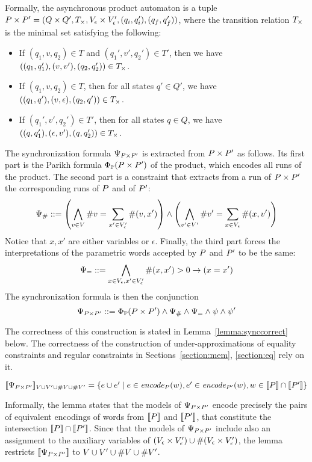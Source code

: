 \documentclass[sigplan,review,anonymous]{acmart}\settopmatter{printfolios=true,printccs=false,printacmref=false}
\begin{document}
Formally, the asynchronous product automaton is a tuple $P \times P' = (Q\times Q', T_\times, V_\epsilon \times V'_\epsilon, (q_i,q_i'),(q_f,q_f'))$, where the transition relation $T_\times$ is the minimal set satisfying the following:
%
\begin{itemize}
\item If $(q_1,v,q_2) \in T$ and $(q_1',v',q_2') \in T'$, then we have $((q_1,q_1'),(v,v'),(q_2,q_2'))\in T_\times$.
\item If $(q_1,v,q_2) \in T$, then for all states $q'\in Q'$, we have $((q_1,q'),(v,\epsilon),(q_2,q'))\in T_\times$.
\item If $(q_1',v',q_2') \in T'$, then for all states $q\in Q$, we have $((q,q_1'),(\epsilon,v'),(q,q_2'))\in T_\times$.
\end{itemize}	
%
The synchronization formula $\Psi_{P \times P'}$ is extracted from $P \times P'$ as follows.
Its first part is the Parikh formula $\Phi_{\mathbb{P}}(P \times P')$ of the product, which encodes all runs of the product.
%
The second part is a constraint that extracts from a run of $P \times P'$ the corresponding runs of $P$ and of $P'$:
$$ \Psi_{\#} ::= 
\left(\bigwedge_{v\in V}\#v = \sum_{x' \in V'_\epsilon} \#{(v,x')}\right)
\land
\left(\bigwedge_{v'\in V'} \#v' = \sum_{x \in V_\epsilon} \#{(x,v')}\right)
$$
Notice that $x,x'$ are either variables or $\epsilon$.
Finally, the third part forces the interpretations of the parametric words accepted by $P$ and $P'$ to be the same:
$$ \Psi_= ::=
\bigwedge_{x\in V_\epsilon,x'\in V'_\epsilon} \#(x,x')>0 \rightarrow (x=x')
$$
The synchronization formula is then the conjunction 
$$
\Psi_{P \times P'} ::= \Phi_{\mathbb{P}}(P \times P') \land \Psi_{\#} \land \Psi_= \land \psi \land \psi'
$$

The correctness of this construction is stated in Lemma~\ref{lemma:synccorrect} below. 
The correctness of the construction of under-approximations of equality constraints and regular constraints in Sections~\ref{section:mem}, \ref{section:eq} rely on it. 
%

\begin{lemma}\label{lemma:synccorrect}
$
[\![\Psi_{P \times P'}]\!]_{V\cup V' \cup \#{V}\cup\#{V'}} =
\{e\cup e'\mid e \in \mathit{encode}_{P} (w), e'\in\mathit{encode}_{P'} (w), w\in[\![P]\!] \cap [\![P']\!]\} 
$
\end{lemma}

Informally, the lemma states that the models of $\Psi_{P \times P'}$ encode precisely the pairs of equivalent encodings of words from $[\![P]\!]$ and $[\![P']\!]$, that constitute the intersection $[\![P]\!] \cap [\![P']\!]$. 
Since that the models of $\Psi_{P \times P'}$ include also an assignment to the auxiliary variables of $(V_\epsilon\times V'_\epsilon) \cup \#{(V_\epsilon\times V'_\epsilon)}$, the lemma restricts $[\![\Psi_{P \times P'}]\!]$ to ${V\cup V' \cup \#{V}\cup\#{V'}}$. 
\end{document}
